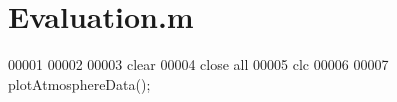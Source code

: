 \hypertarget{_evaluation_8m_source}{}\section{Evaluation.\+m}
\label{_evaluation_8m_source}

\begin{DoxyCode}
00001 %
00002 
00003 clear 
00004 close all 
00005 clc
00006 
00007 plotAtmosphereData();
\end{DoxyCode}
